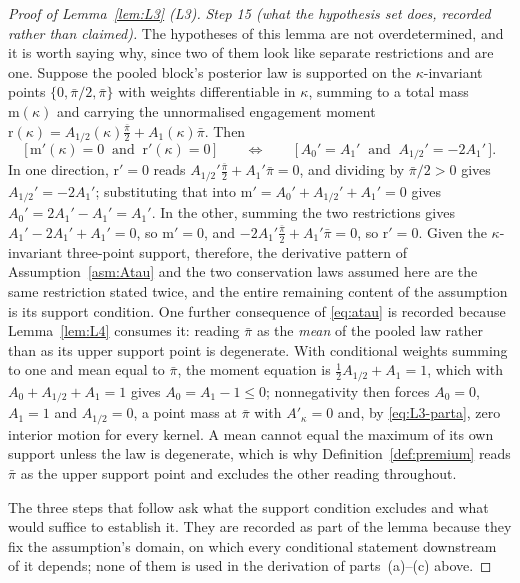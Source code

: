 \documentclass[11pt]{article}
\newcommand{\Akap}{A'_{\kappa}}
\begin{document}
\begin{proof}[Proof of Lemma~\ref{lem:L3} (L3)]
\emph{Step 15 (what the hypothesis set does, recorded rather than claimed).} The hypotheses of this
lemma are not overdetermined, and it is worth saying why, since two of them look like separate
restrictions and are one. Suppose the pooled block's posterior law is supported on the
$\kappa$-invariant points $\{0,\bar\pi/2,\bar\pi\}$ with weights differentiable in $\kappa$, summing
to a total mass $\mathrm{m}(\kappa)$ and carrying the unnormalised engagement moment
$\mathrm{r}(\kappa) = A_{1/2}(\kappa)\tfrac{\bar\pi}{2}+A_1(\kappa)\bar\pi$. Then
\begin{equation}
\label{eq:L3-equiv}
\bigl[\,\mathrm{m}'(\kappa) = 0 \ \text{ and }\ \mathrm{r}'(\kappa) = 0\,\bigr]
\qquad \Longleftrightarrow \qquad
\bigl[\,A_0' = A_1' \ \text{ and }\ A_{1/2}' = -2A_1'\,\bigr].
\end{equation}
In one direction, $\mathrm{r}' = 0$ reads $A_{1/2}'\tfrac{\bar\pi}{2}+A_1'\bar\pi = 0$, and dividing
by $\bar\pi/2 > 0$ gives $A_{1/2}' = -2A_1'$; substituting that into
$\mathrm{m}' = A_0'+A_{1/2}'+A_1' = 0$ gives $A_0' = 2A_1'-A_1' = A_1'$. In the other, summing the
two restrictions gives $A_1'-2A_1'+A_1' = 0$, so $\mathrm{m}' = 0$, and
$-2A_1'\tfrac{\bar\pi}{2}+A_1'\bar\pi = 0$, so $\mathrm{r}' = 0$. Given the $\kappa$-invariant
three-point support, therefore, the derivative pattern of Assumption~\ref{asm:Atau} and the two
conservation laws assumed here are the same restriction stated twice, and the entire remaining
content of the assumption is its support condition. One further consequence of \eqref{eq:atau} is
recorded because Lemma~\ref{lem:L4} consumes it: reading $\bar\pi$ as the \emph{mean} of the pooled
law rather than as its upper support point is degenerate. With conditional weights summing to one and
mean equal to $\bar\pi$, the moment equation is $\tfrac12 A_{1/2}+A_1 = 1$, which with
$A_0+A_{1/2}+A_1 = 1$ gives $A_0 = A_1-1 \le 0$; nonnegativity then forces $A_0 = 0$, $A_1 = 1$ and
$A_{1/2} = 0$, a point mass at $\bar\pi$ with $\Akap = 0$ and, by \eqref{eq:L3-parta}, zero interior
motion for every kernel. A mean cannot equal the maximum of its own support unless the law is
degenerate, which is why Definition~\ref{def:premium} reads $\bar\pi$ as the upper support point and
excludes the other reading throughout.

The three steps that follow ask what the support condition excludes and what would suffice to
establish it. They are recorded as part of the lemma because they fix the assumption's domain, on
which every conditional statement downstream of it depends; none of them is used in the derivation
of parts~(a)--(c) above.


\end{proof}
\end{document}
